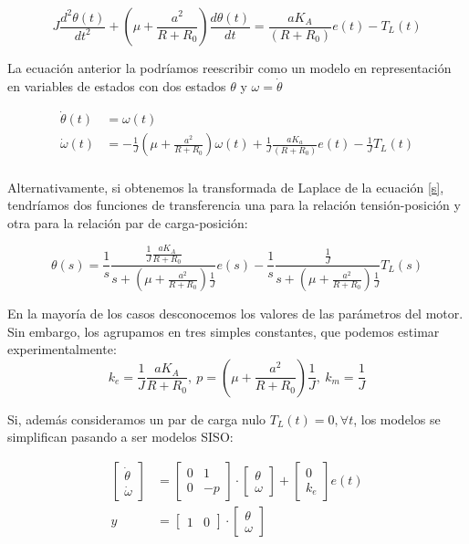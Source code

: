 \documentclass[10pt,a4paper]{report}
\begin{document}
\begin{equation}\label{s}
J\frac{d^2\theta(t)}{dt^2}+\left(\mu+\frac{a^2}{R+R_0}\right)\frac{d\theta(t)}{dt} = \frac{aK_A}{(R+R_0)}e(t)-T_L(t)
\end{equation}

La ecuación anterior la podríamos reescribir como un modelo en representación en variables de estados con dos estados $\theta$ y $\omega= \dot{\theta}$ 

\begin{align}
\dot{\theta}(t) &= \omega(t)\\
\dot{\omega}(t) &=-\frac{1}{J}\left(\mu+\frac{a^2}{R+R_0}\right)\omega(t)+\frac{1}{J}\frac{aK_a}{(R+R_0)}e(t)-\frac{1}{J}T_L(t)\\
\end{align}



Alternativamente, si obtenemos la transformada de Laplace de la ecuación \ref{s}, tendríamos dos funciones de transferencia una para la relación tensión-posición y otra para la relación par de carga-posición:

\begin{equation}
\theta(s) = \frac{1}{s}\frac{\frac{1}{J}\frac{aK_A}{R+R_0}}{s+\left(\mu+\frac{a^2}{R+R_0}\right)\frac{1}{J}}e(s)-\frac{1}{s}\frac{\frac{1}{J}}{s+\left(\mu+\frac{a^2}{R+R_0}\right)\frac{1}{J}}T_L(s)
\end{equation}

En la mayoría de los casos desconocemos los valores de las parámetros del motor. Sin embargo, los agrupamos en tres simples constantes, que podemos estimar experimentalmente:
\begin{equation}
k_e = \frac{1}{J}\frac{aK_A}{R+R_0},\ p = \left(\mu+\frac{a^2}{R+R_0}\right)\frac{1}{J},\ k_m = \frac{1}{J}
\end{equation}
 
Si, además consideramos un par de carga nulo $T_L(t) = 0, \forall t$, los modelos se simplifican pasando a ser modelos SISO:

\begin{align} \label{eq311}
\begin{bmatrix}
\dot{\theta}\\
\dot{\omega}
\end{bmatrix} &= \begin{bmatrix}
0 & 1\\
0 &-p
\end{bmatrix}\cdot\begin{bmatrix}
\theta\\
\omega
\end{bmatrix}+\begin{bmatrix}
0\\
k_e
\end{bmatrix}e(t)\\ \label{eq312}
y &= \begin{bmatrix}
1& 0
\end{bmatrix}\cdot\begin{bmatrix}
\theta\\
\omega
\end{bmatrix}
\end{align} 
\end{document}

